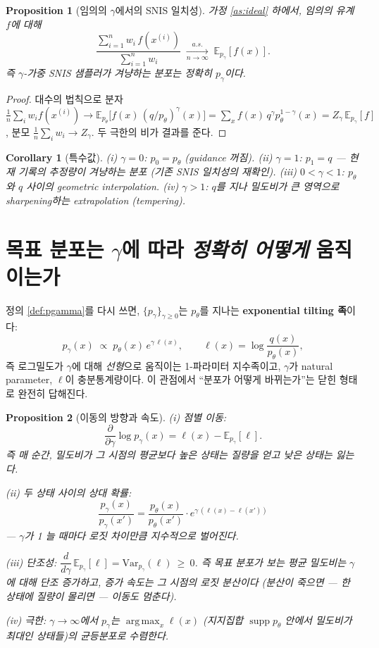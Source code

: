 \documentclass[11pt]{article}
\newcommand{\pth}{p_\theta}
\newcommand{\qexc}{q}
\DeclareMathOperator{\supp}{supp}
\DeclareMathOperator*{\argmax}{arg\,max}
\theoremstyle{plain}
\newtheorem{proposition}{Proposition}
\newtheorem{corollary}{Corollary}
\theoremstyle{definition}
\begin{document}
\begin{proposition}[임의의 $\gamma$에서의 SNIS 일치성]\label{prop:snis}
가정 \ref{as:ideal} 하에서, 임의의 유계 $f$에 대해
\[
\frac{\sum_{i=1}^{n} w_i\, f(x^{(i)})}{\sum_{i=1}^{n} w_i}
\;\xrightarrow[n \to \infty]{a.s.}\;
\mathbb{E}_{p_\gamma}[f(x)].
\]
즉 $\gamma$-가중 SNIS 샘플러가 겨냥하는 분포는 정확히 $p_\gamma$이다.
\end{proposition}

\begin{proof}
대수의 법칙으로 분자 $\tfrac1n\sum_i w_i f(x^{(i)}) \to
\mathbb{E}_{\pth}\!\bigl[f(x)\,(\qexc/\pth)^{\gamma}(x)\bigr]
= \sum_x f(x)\, \qexc^{\gamma} \pth^{1-\gamma}(x) = Z_\gamma\, \mathbb{E}_{p_\gamma}[f]$,
분모 $\tfrac1n\sum_i w_i \to Z_\gamma$. 두 극한의 비가 결과를 준다.
\end{proof}

\begin{corollary}[특수값]\label{cor:special}
\emph{(i)} $\gamma = 0$: $p_0 = \pth$ (guidance 꺼짐).
\emph{(ii)} $\gamma = 1$: $p_1 = \qexc$ --- 현재 기록의 추정량이 겨냥하는 분포
(기존 SNIS 일치성의 재확인).
\emph{(iii)} $0 < \gamma < 1$: $\pth$와 $\qexc$ 사이의 geometric interpolation.
\emph{(iv)} $\gamma > 1$: $\qexc$를 지나 밀도비가 큰 영역으로 sharpening하는
extrapolation (tempering).
\end{corollary}

\section{목표 분포는 $\gamma$에 따라 \emph{정확히 어떻게} 움직이는가}

정의 \ref{def:pgamma}를 다시 쓰면, $\{p_\gamma\}_{\gamma \ge 0}$는 $\pth$를 지나는
\textbf{exponential tilting 족}이다:
\[
p_\gamma(x) \;\propto\; \pth(x)\, e^{\gamma\,\ell(x)},
\qquad \ell(x) = \log\frac{\qexc(x)}{\pth(x)},
\]
즉 로그밀도가 $\gamma$에 대해 \emph{선형}으로 움직이는 1-파라미터 지수족이고, $\gamma$가
natural parameter, $\ell$이 충분통계량이다. 이 관점에서 ``분포가 어떻게 바뀌는가''는
닫힌 형태로 완전히 답해진다.

\begin{proposition}[이동의 방향과 속도]\label{prop:move}
\emph{(i) 점별 이동:}
\[
\frac{\partial}{\partial \gamma} \log p_\gamma(x)
= \ell(x) - \mathbb{E}_{p_\gamma}[\ell].
\]
즉 매 순간, 밀도비가 그 시점의 평균보다 높은 상태는 질량을 얻고 낮은 상태는 잃는다.

\emph{(ii) 두 상태 사이의 상대 확률:}
\[
\frac{p_\gamma(x)}{p_\gamma(x')}
= \frac{\pth(x)}{\pth(x')} \cdot e^{\gamma\,(\ell(x) - \ell(x'))}
\]
--- $\gamma$가 1 늘 때마다 로짓 차이만큼 지수적으로 벌어진다.

\emph{(iii) 단조성:} $\dfrac{d}{d\gamma}\, \mathbb{E}_{p_\gamma}[\ell]
= \mathrm{Var}_{p_\gamma}(\ell) \ \ge\ 0$.
즉 목표 분포가 보는 평균 밀도비는 $\gamma$에 대해 단조 증가하고, 증가 속도는 그 시점의
로짓 분산이다 (분산이 죽으면 --- 한 상태에 질량이 몰리면 --- 이동도 멈춘다).

\emph{(iv) 극한:} $\gamma \to \infty$에서 $p_\gamma$는
$\argmax_x \ell(x)$ (지지집합 $\supp\pth$ 안에서 밀도비가 최대인 상태들)의 균등분포로
수렴한다.
\end{proposition}
\end{document}
